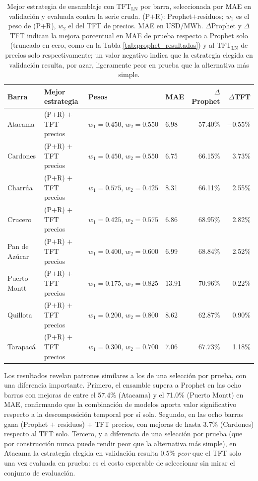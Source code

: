 \begin{table}[htbp]
    \centering
    \small
    \begin{tabular}{llllrr}
        \toprule
        Barra & Mejor estrategia & Pesos & MAE & $\Delta$Prophet & $\Delta$TFT \\
        \midrule
        Atacama        & (P$+$R) $+$ TFT precios  & $w_1{=}0.450,\,w_2{=}0.550$ & 6.98  & 57.40\% & $-0.55\%$ \\
        Cardones       & (P$+$R) $+$ TFT precios  & $w_1{=}0.450,\,w_2{=}0.550$ & 6.75  & 66.15\% & 3.73\% \\
        Charrúa        & (P$+$R) $+$ TFT precios  & $w_1{=}0.575,\,w_2{=}0.425$ & 8.31  & 66.11\% & 2.55\% \\
        Crucero        & (P$+$R) $+$ TFT precios  & $w_1{=}0.425,\,w_2{=}0.575$ & 6.86  & 68.95\% & 2.82\% \\
        Pan de Azúcar  & (P$+$R) $+$ TFT precios  & $w_1{=}0.400,\,w_2{=}0.600$ & 6.99  & 68.84\% & 2.52\% \\
        Puerto Montt   & (P$+$R) $+$ TFT precios  & $w_1{=}0.175,\,w_2{=}0.825$ & 13.91  & 70.96\% & 0.22\% \\
        Quillota       & (P$+$R) $+$ TFT precios  & $w_1{=}0.200,\,w_2{=}0.800$ & 8.62  & 62.87\% & 0.90\% \\
        Tarapacá       & (P$+$R) $+$ TFT precios  & $w_1{=}0.300,\,w_2{=}0.700$ & 7.06  & 67.73\% & 1.18\% \\
        \bottomrule
    \end{tabular}
    \vspace{0.2cm}
    \caption{Mejor estrategia de ensamblaje con $\text{TFT}_\text{LN}$ por barra, seleccionada por MAE en validación y evaluada contra la serie cruda. (P$+$R): Prophet$+$residuos; $w_1$ es el peso de (P$+$R), $w_2$ el del TFT de precios. MAE en USD/MWh. $\Delta$Prophet y $\Delta$TFT indican la mejora porcentual en MAE de prueba respecto a Prophet solo (truncado en cero, como en la Tabla \ref{tab:prophet_resultados}) y al $\text{TFT}_\text{LN}$ de precios solo respectivamente; un valor negativo indica que la estrategia elegida en validación resulta, por azar, ligeramente peor en prueba que la alternativa más simple.}
    \label{tab:mejores_estrategias}
\end{table}

Los resultados revelan patrones similares a los de una selección por prueba, con una diferencia importante. Primero, el ensamble supera a Prophet en las ocho barras con mejoras de entre el 57.4\% (Atacama) y el 71.0\% (Puerto Montt) en MAE, confirmando que la combinación de modelos aporta valor significativo respecto a la descomposición temporal por sí sola. Segundo, en las ocho barras gana (Prophet $+$ residuos) $+$ TFT precios, con mejoras de hasta 3.7\% (Cardones) respecto al TFT solo. Tercero, y a diferencia de una selección por prueba (que por construcción nunca puede rendir peor que la alternativa más simple), en Atacama la estrategia elegida en validación resulta 0.5\% \emph{peor} que el TFT solo una vez evaluada en prueba: es el costo esperable de seleccionar sin mirar el conjunto de evaluación.

